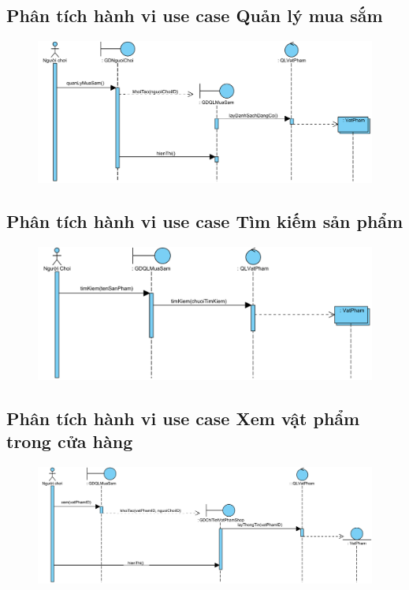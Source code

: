 \documentclass[3p]{elsarticle}
\begin{document}
\subsection{Phân tích hành vi use case Quản lý mua sắm}
\begin{figure}[!htbp]
	\hspace*{-.5in}
	\centering
	\includegraphics[scale=.55]{images/sequence-pdfs/gamer/ShopManagement.pdf}
\end{figure}

\subsection{Phân tích hành vi use case Tìm kiếm sản phẩm}
\begin{figure}[!htbp]
	\hspace*{-.5in}
	\centering
	\includegraphics[scale=.55]{images/sequence-pdfs/gamer/ShopManagement_Search.pdf}
\end{figure}
\newpage

\subsection{Phân tích hành vi use case Xem vật phẩm trong cửa hàng}
\begin{figure}[!htbp]
	\hspace*{-.5in}
	\centering
	\includegraphics[scale=.55]{images/sequence-pdfs/gamer/ShopManagement_ViewItem.pdf}
\end{figure}
\end{document}
